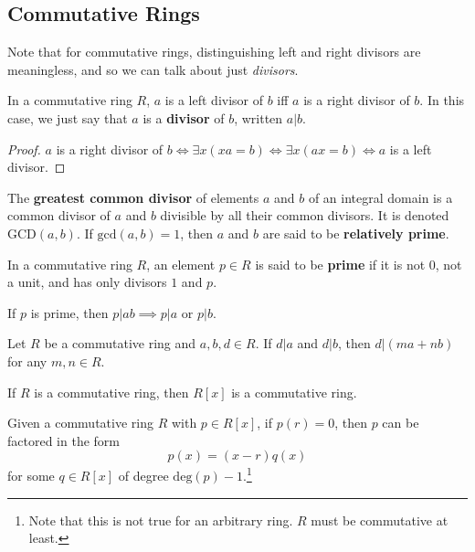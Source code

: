 \subsection{Commutative Rings} 

  Note that for commutative rings, distinguishing left and right divisors are meaningless, and so we can talk about just \textit{divisors}. 

  \begin{lemma}[Left=Right Divisors]
    In a commutative ring $R$, $a$ is a left divisor of $b$ iff $a$ is a right divisor of $b$. In this case, we just say that $a$ is a \textbf{divisor} of $b$, written $a | b$. 
  \end{lemma}
  \begin{proof}
    $a$ is a right divisor of $b \iff \exists x (xa = b) \iff \exists x (ax = b) \iff a$ is a left divisor. 
  \end{proof} 

  \begin{definition}
    The \textbf{greatest common divisor} of elements $a$ and $b$ of an integral domain is a common divisor of $a$ and $b$ divisible by all their common divisors. It is denoted GCD$(a, b)$. If $\mathrm{gcd}(a, b) = 1$, then $a$ and $b$ are said to be \textbf{relatively prime}. 
  \end{definition} 

  \begin{definition}
    In a commutative ring $R$, an element $p \in R$ is said to be \textbf{prime} if it is not $0$, not a unit, and has only divisors $1$ and $p$. 
  \end{definition}

  \begin{lemma}[Euclid]
    If $p$ is prime, then $p|ab \implies p|a$ or $p|b$.  
  \end{lemma}

  \begin{lemma} 
    Let $R$ be a commutative ring and $a, b, d \in R$. If $d|a$ and $d|b$, then $d | (ma + nb)$ for any $m, n \in R$. 
  \end{lemma} 

  \begin{theorem}
    If $R$ is a commutative ring, then $R[x]$ is a commutative ring. 
  \end{theorem}

  \begin{theorem}
    Given a commutative ring $R$ with $p \in R[x]$, if $p(r) = 0$, then $p$ can be factored in the form 
    \begin{equation}
      p(x) = (x - r) q(x)
    \end{equation}
    for some $q \in R[x]$ of degree $\mathrm{deg}(p) - 1$.\footnote{Note that this is not true for an arbitrary ring. $R$ must be commutative at least. }
  \end{theorem}

